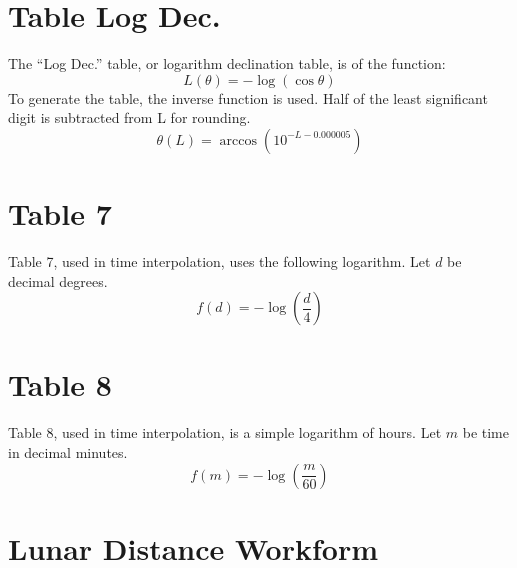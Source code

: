 \documentclass[letterpaper]{article}
\numberwithin{equation}{section}
\begin{document}
\section{Table Log Dec.}
	The ``Log Dec.'' table, or logarithm declination table, is of the function:
	\begin{equation}
		L(\theta) = -\log(\cos\theta)
	\end{equation}
	To generate the table, the inverse function is used. Half of the least significant digit is subtracted from L for rounding.
	\begin{equation}
		\theta(L) = \arccos(10^{-L-0.000005})
	\end{equation}

\section{Table 7}
	Table 7, used in time interpolation, uses the following logarithm. Let $d$ be decimal degrees.
	\begin{equation}
		f(d) = -\log\left(\frac{d}{4}\right)
	\end{equation}

\section{Table 8}
	Table 8, used in time interpolation, is a simple logarithm of hours. Let $m$ be time in decimal minutes.
	\begin{equation}
		f(m) = -\log\left(\frac{m}{60}\right)
	\end{equation}

\clearpage \section{Lunar Distance Workform}
	\begin{centering}\resizebox{\textwidth}{!}{%
	}\end{centering}
\end{document}
